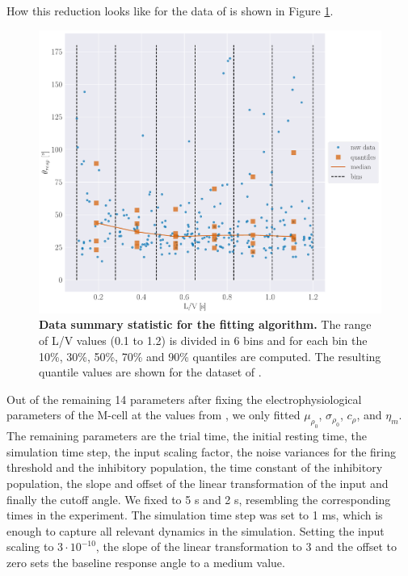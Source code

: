 \documentclass[a4paper,10pt,hidelinks]{scrreprt}
\begin{document}
    How this reduction looks like for the data of \cite{Bhattacharyya2017} is shown in Figure \ref{fig:expm_data_to_quantiles}.\\
    \begin{figure}[H]
    	\begin{center}
			\includegraphics[width=\textwidth]{figure_data_to_quant.pdf}
    	\end{center}
    	\caption{\textbf{Data summary statistic for the fitting algorithm.} The range of L/V values (0.1 to 1.2) is divided in 6 bins and for each bin the 10\%, 30\%, 50\%, 70\% and 90\% quantiles are computed. The resulting quantile values are shown for the dataset of \cite{Bhattacharyya2017}.}
    	\label{fig:expm_data_to_quantiles}
    \end{figure}
    Out of the remaining 14 parameters after fixing the electrophysiological parameters of the M-cell at the values from \cite{Koyama2016}, we only fitted $\mu_{\rho_{0}}$, $\sigma_{\rho_{0}}$, $c_{\rho}$, and $\eta_{m}$.
    The remaining parameters are the trial time, the initial resting time, the simulation time step, the input scaling factor, the noise variances for the firing threshold and the inhibitory population, the time constant of the inhibitory population, the slope and offset of the linear transformation of the input and finally the cutoff angle.
    We fixed to 5 s and 2 s, resembling the corresponding times in the experiment.
    The simulation time step was set to 1 ms, which is enough to capture all relevant dynamics in the simulation.
    Setting the input scaling to $3 \cdot 10^{-10}$, the slope of the linear transformation to 3 and the offset to zero sets the baseline response angle to a medium value.
\end{document}

